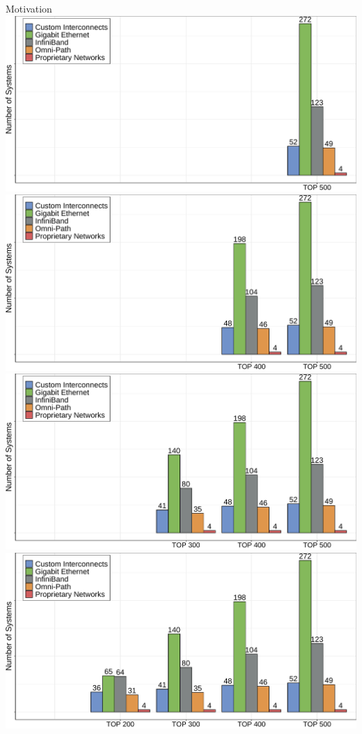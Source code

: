 \documentclass{beamer}
\begin{document}
\begin{frame}{Motivation}
\includegraphics[width=\textwidth]{SLIDES/img/TOP500-1.pdf}
       \framebreak
 \includegraphics[width=\textwidth]{SLIDES/img/TOP500-2.pdf}
       \framebreak
 \includegraphics[width=\textwidth]{SLIDES/img/TOP500-3.pdf}
       \framebreak
 \includegraphics[width=\textwidth]{SLIDES/img/TOP500-4.pdf}

\end{frame}
\end{document}
